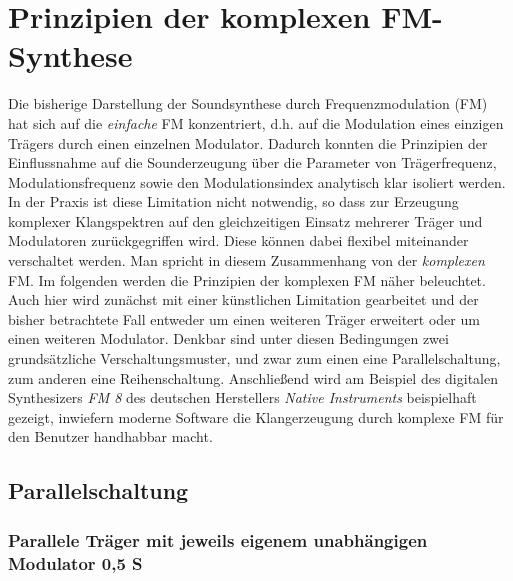 \section{Prinzipien der komplexen FM-Synthese}

Die bisherige Darstellung der Soundsynthese durch Frequenzmodulation (FM) hat sich auf die \textit{einfache} FM konzentriert, d.h. auf die Modulation eines einzigen Trägers durch einen einzelnen Modulator. Dadurch konnten die Prinzipien der Einflussnahme auf die Sounderzeugung über die Parameter von Trägerfrequenz, Modulationsfrequenz sowie den Modulationsindex analytisch klar isoliert werden. In der Praxis ist diese Limitation nicht notwendig, so dass zur Erzeugung komplexer Klangspektren auf den gleichzeitigen Einsatz mehrerer Träger und Modulatoren zurückgegriffen wird. Diese können dabei flexibel miteinander verschaltet werden. Man spricht in diesem Zusammenhang von der \textit{komplexen} FM. Im folgenden werden die Prinzipien der komplexen FM näher beleuchtet. Auch hier wird zunächst mit einer künstlichen Limitation gearbeitet und der bisher betrachtete Fall entweder um einen weiteren Träger erweitert oder um einen weiteren Modulator. Denkbar sind unter diesen Bedingungen zwei grundsätzliche Verschaltungsmuster, und zwar zum einen eine Parallelschaltung, zum anderen eine Reihenschaltung. Anschließend wird am Beispiel des digitalen Synthesizers \textit{FM 8} des deutschen Herstellers \textit{Native Instruments} beispielhaft gezeigt, inwiefern moderne Software die Klangerzeugung durch komplexe FM für den Benutzer handhabbar macht. 

\subsection{Parallelschaltung}

\subsubsection{Parallele Träger mit jeweils eigenem unabhängigen Modulator 0,5 S}

